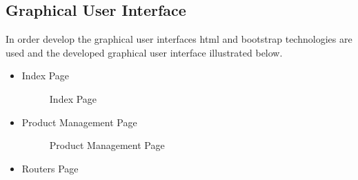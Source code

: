 \documentclass[a4Paper,12pt]{report}
\begin{document}
\subsection{Graphical User Interface}
In order develop the graphical user interfaces html and bootstrap technologies are used and the developed graphical user interface illustrated below.\\[12pt]
\begin{itemize}
\item Index Page
\begin{figure}[H]
\centering
{}
\caption{Index Page}
\end{figure}
\item Product Management Page
\begin{figure}[H]
\centering
{}
\caption{Product Management Page}
\end{figure}
\item Routers Page
\begin{figure}[H]
\centering
{}

\end{figure}
\end{itemize}
\end{document}
